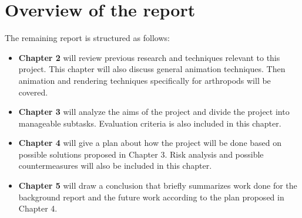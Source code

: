 \section{Overview of the report}
The remaining report is structured as follows: 
\begin{itemize}
  \item \textbf{Chapter 2} will review previous research and techniques relevant to this project. This chapter will also discuss general animation techniques. Then animation and rendering techniques specifically for arthropods will be covered.
  \item \textbf{Chapter 3} will analyze the aims of the project and divide the project into manageable subtasks. Evaluation criteria is also included in this chapter. 
  \item \textbf{Chapter 4} will give a plan about how the project will be done based on possible solutions proposed in Chapter 3. Risk analysis and possible countermeasures will also be included in this chapter.
  \item \textbf{Chapter 5} will draw a conclusion that briefly summarizes work done for the background report and the future work according to the plan proposed in Chapter 4.
\end{itemize}

